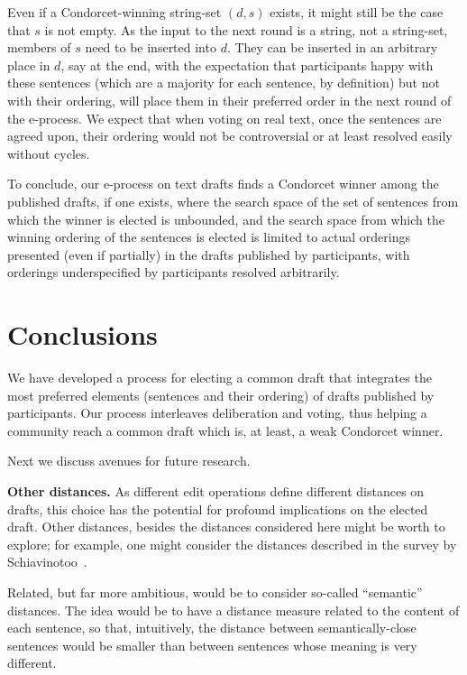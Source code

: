 \documentclass[sigconf]{aamas}  %
\newcommand{\mypara}[1]{\smallskip\noindent\textbf{#1.}}
\begin{document}
Even if a Condorcet-winning string-set $(d,s)$ exists, it might still be the case that $s$ is not empty.  As the input to the next round is a string, not a string-set, members of $s$ need to be inserted into $d$.  They can be inserted in an arbitrary place in $d$, say at the end, with the expectation that participants happy with these sentences (which are  a majority for each sentence, by definition) but not with their ordering, will place them in their preferred order in the next round of the e-process. We expect that when voting on real text, once the sentences are agreed upon, their ordering would not be controversial or at least resolved easily without cycles.  

To conclude, our e-process on text drafts finds a Condorcet winner among the published drafts, if one exists, where the search space of the set of sentences from which the winner is elected is unbounded, and the search space from which the winning ordering of the sentences is elected is limited to actual orderings presented (even if partially) in the drafts published by participants, with orderings underspecified by participants resolved arbitrarily.


\section{Conclusions}
\label{section:conclusions}

We have developed a process for electing a common draft that integrates the most preferred elements (sentences and their ordering) of drafts published by participants.
%
Our process interleaves deliberation and voting, thus helping a community reach a common draft which is, at least, a weak Condorcet winner.

Next we discuss avenues for future research. 


\mypara{Other distances}
%
As different edit operations define different distances on drafts, this choice has the potential for profound implications on the elected draft. Other distances, besides the distances considered here might be worth to explore; for example, one might consider the distances described in the survey by Schiavinotoo~\cite{schiavinotto2007review}.

Related, but far more ambitious, would be to consider so-called ``semantic'' distances. The idea would be to have a distance measure related to the content of each sentence, so that, intuitively, the distance between semantically-close sentences would be smaller than between sentences whose meaning is very different.
\end{document}
